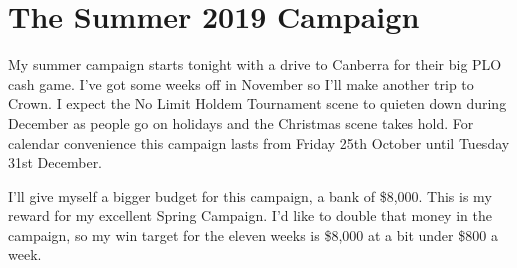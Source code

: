 \section*{The Summer 2019 Campaign}

My summer campaign starts tonight with a drive to Canberra for their
big PLO cash game. I've got some weeks off in November so I'll make
another trip to Crown. I expect the No Limit Holdem Tournament scene
to quieten down during December as people go on holidays and the
Christmas scene takes hold. For calendar convenience this campaign
lasts from Friday 25th October until Tuesday 31st December.

I'll give myself a bigger budget for this campaign, a bank of
\$8,000. This is my reward for my excellent Spring Campaign. I'd like
to double that money in the campaign, so my win target for the eleven
weeks is \$8,000 at a bit under \$800 a week.
